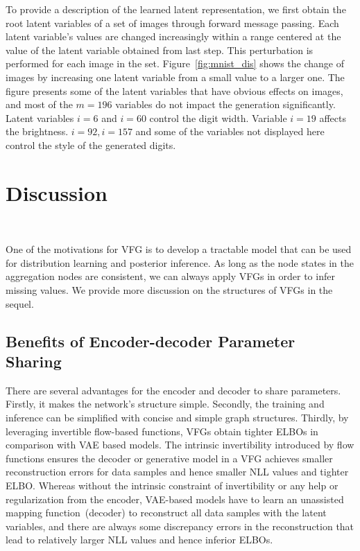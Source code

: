 \documentclass[sigconf, anonymous, review]{acmart}
\theoremstyle{plain}
\theoremstyle{definition}
\theoremstyle{remark}
\begin{document}
To provide a description of the learned latent representation, we first obtain the root latent variables of a set of images through forward message passing. Each latent variable's values are changed increasingly within a range centered at the value of the latent variable obtained from last step. 
This perturbation is performed for each image in the set.
Figure~\ref{fig:mnist_dis} shows the change of images by increasing one latent variable from a small value to a larger one. The figure presents some of the latent variables that have obvious effects on images, and most of the $m=196$ variables do not impact the generation significantly. Latent variables $i=6$ and $i=60$ control the digit width. Variable $i=19$ affects the brightness.  $i=92, i=157$ and some of the variables not displayed here control the style of the generated digits. 



\section{Discussion}~\label{sec:discuss}


One of the motivations for VFG is to develop a tractable model that can be used for distribution learning and posterior inference.
As long as the node states in the aggregation nodes are consistent, we can always apply VFGs in order to infer missing values. 
We provide more discussion on the structures of VFGs in the sequel.

\subsection{Benefits of Encoder-decoder Parameter Sharing}
There are several advantages for the encoder and decoder to share parameters. 
 Firstly, it makes the network's structure simple. 
 Secondly, the training and inference can be simplified with concise and simple graph structures. 
 Thirdly, by leveraging invertible flow-based functions, VFGs  obtain tighter ELBOs in comparison with VAE based models.%
 The intrinsic invertibility introduced by flow functions ensures the decoder or generative model in a VFG  achieves smaller reconstruction errors for data samples and hence smaller NLL values and tighter ELBO. Whereas without the intrinsic constraint of invertibility or any help or regularization from the encoder, VAE-based models have to learn an unassisted mapping function~(decoder) to reconstruct all data samples with the latent variables, and there are always some discrepancy errors in the reconstruction that lead to relatively larger NLL values and hence inferior ELBOs.
\end{document}
